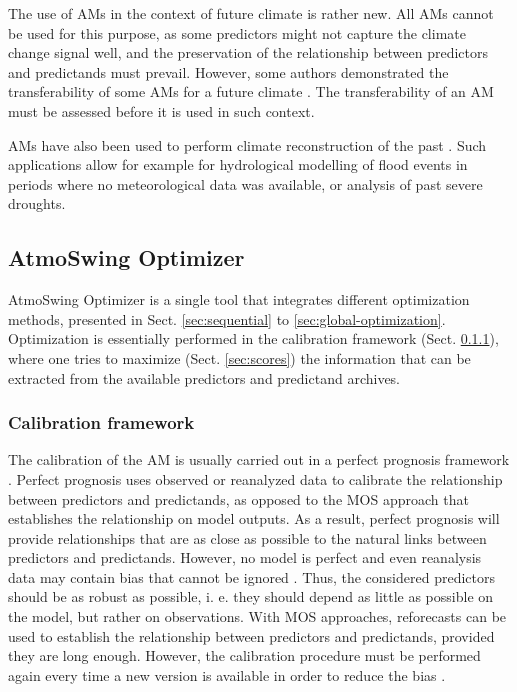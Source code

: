 \documentclass[review]{elsarticle}
\begin{document}
The use of AMs in the context of future climate is rather new. All AMs cannot be used for this purpose, as some predictors might not capture the climate change signal well, and the preservation of the relationship between predictors and predictands must prevail. However, some authors demonstrated the transferability of some AMs for a future climate \citep{Dayon2015, Dayon2018, Raynaud2016, Turco2017}. The transferability of an AM must be assessed before it is used in such context. 

AMs have also been used to perform climate reconstruction of the past \citep{Caillouet2016, Caillouet2017, Bonnet2017}. Such applications allow for example for hydrological modelling of flood events in periods where no meteorological data was available, or analysis of past severe droughts.


\subsection{AtmoSwing Optimizer}
\label{sec:optimizer}

AtmoSwing Optimizer is a single tool that integrates different optimization methods, presented in Sect. \ref{sec:sequential} to \ref{sec:global-optimization}. Optimization is essentially performed in the calibration framework (Sect. \ref{sec:calibration-framework}), where one tries to maximize (Sect. \ref{sec:scores}) the information that can be extracted from the available predictors and predictand archives.


\subsubsection{Calibration framework}
\label{sec:calibration-framework}

The calibration of the AM is usually carried out in a perfect prognosis \citep{Klein1959} framework \citep{Bontron2004, BenDaoud2010}. Perfect prognosis uses observed or reanalyzed data to calibrate the relationship between predictors and predictands, as opposed to the MOS approach that establishes the relationship on model outputs. As a result, perfect prognosis will provide relationships that are as close as possible to the natural links between predictors and predictands. However, no model is perfect and even reanalysis data may contain bias that cannot be ignored \citep{Dayon2015, Horton2018b}. Thus, the considered predictors should be as robust as possible, i. e. they should depend as little as possible on the model, but rather on observations. With MOS approaches, reforecasts can be used to establish the relationship between predictors and predictands, provided they are long enough. However, the calibration procedure must be performed again every time a new version is available in order to reduce the bias \citep{Wilson2002}.
\end{document}
